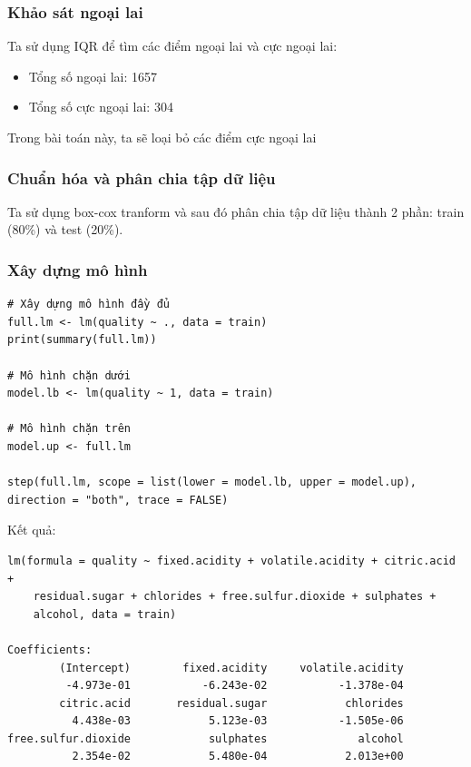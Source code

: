 \subsubsection{Khảo sát ngoại lai}

Ta sử dụng IQR để tìm các điểm ngoại lai và cực ngoại lai:
\begin{itemize}
    \item Tổng số ngoại lai: 1657
    \item Tổng số cực ngoại lai: 304
\end{itemize}
Trong bài toán này, ta sẽ loại bỏ các điểm cực ngoại lai

\subsubsection{Chuẩn hóa và phân chia tập dữ liệu}

Ta sử dụng box-cox tranform và sau đó phân chia tập dữ liệu thành 2 phần: train (80\%) và test (20\%).

\subsubsection{Xây dựng mô hình}

\begin{lstlisting}
# Xây dựng mô hình đầy đủ
full.lm <- lm(quality ~ ., data = train)
print(summary(full.lm))

# Mô hình chặn dưới
model.lb <- lm(quality ~ 1, data = train)

# Mô hình chặn trên
model.up <- full.lm

step(full.lm, scope = list(lower = model.lb, upper = model.up), direction = "both", trace = FALSE)
\end{lstlisting}
Kết quả:
\begin{lstlisting}
lm(formula = quality ~ fixed.acidity + volatile.acidity + citric.acid + 
    residual.sugar + chlorides + free.sulfur.dioxide + sulphates + 
    alcohol, data = train)

Coefficients:
        (Intercept)        fixed.acidity     volatile.acidity  
         -4.973e-01           -6.243e-02           -1.378e-04  
        citric.acid       residual.sugar            chlorides  
          4.438e-03            5.123e-03           -1.505e-06  
free.sulfur.dioxide            sulphates              alcohol  
          2.354e-02            5.480e-04            2.013e+00  
\end{lstlisting}

